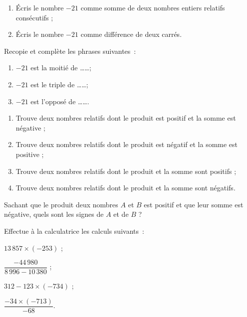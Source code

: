 \begin{exercice}[Le nombre $-21$...]
\begin{enumerate}
 \item Écris le nombre $-21$ comme somme de deux nombres entiers relatifs consécutifs ;
 \item Écris le nombre $-21$ comme différence de deux carrés.
 \end{enumerate}
\end{exercice}


\begin{exercice}
Recopie et complète les phrases suivantes :
\begin{enumerate}
 \item $-21$ est la moitié de \ldots \ldots ;
 \item $-21$ est le triple de \ldots \ldots ;
 \item $-21$ est l'opposé de \ldots \ldots.
 \end{enumerate}
\end{exercice}


\begin{exercice}
\begin{enumerate}
 \item Trouve deux nombres relatifs dont le produit est positif et la somme est négative ;
 \item Trouve deux nombres relatifs dont le produit est négatif et la somme est positive ;
 \item Trouve deux nombres relatifs dont le produit et la somme sont positifs ;
 \item Trouve deux nombres relatifs dont le produit et la somme sont négatifs.
 \end{enumerate}
\end{exercice}


\begin{exercice}[Énigme]
Sachant que le produit deux nombres $A$ et $B$ est positif et que leur somme est négative, quels sont les signes de $A$ et de $B$ ?
\end{exercice}


\begin{exercice}[Calculatrice]
Effectue à la calculatrice les calculs suivants :
\begin{colenumerate}{2}
 \item $13\,857 \times (-253)$ ;
 \item $\dfrac{-44\,980}{8\,996 - 10\,380}$ ;
 \item $312 - 123 \times (-734)$ ;
 \item $\dfrac{-34 \times (-713)}{-68}$.
 \end{colenumerate}
\end{exercice}



